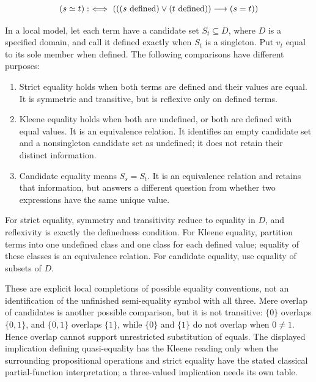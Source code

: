 \begin{definition}
\[
(s\simeq t) :\ \Longleftrightarrow\  (((s \mathrm{\ defined})\lor(t \mathrm{\ defined})) \longrightarrow (s=t))
\]
\end{definition}

\begin{proposition}
In a local model, let each term have a candidate set $S_t\subseteq D$,
where $D$ is a specified domain, and call it defined exactly when $S_t$
is a singleton. Put $v_t$ equal to its sole member when defined.
The following comparisons have different purposes:
\begin{enumerate}
\item Strict equality holds when both terms are defined and their values
are equal. It is symmetric and transitive, but is reflexive only on
defined terms.
\item Kleene equality holds when both are undefined, or both are defined
with equal values. It is an equivalence relation. It identifies an empty
candidate set and a nonsingleton candidate set as undefined; it does not
retain their distinct information.
\item Candidate equality means $S_s=S_t$. It is an equivalence relation
and retains that information, but answers a different question from
whether two expressions have the same unique value.
\end{enumerate}
\end{proposition}
\Proof
For strict equality, symmetry and transitivity reduce to equality in
$D$, and reflexivity is exactly the definedness condition. For Kleene
equality, partition terms into one undefined class and one class for each
defined value; equality of these classes is an equivalence relation.
For candidate equality, use equality of subsets of $D$.
\Done

These are explicit local completions of possible equality conventions,
not an identification of the unfinished semi-equality symbol with all
three. Mere overlap of candidates is another possible comparison, but
it is not transitive: $\{0\}$ overlaps $\{0,1\}$, and $\{0,1\}$
overlaps $\{1\}$, while $\{0\}$ and $\{1\}$ do not overlap when
$0\ne1$. Hence overlap cannot support unrestricted substitution of equals.
The displayed implication defining quasi-equality has the Kleene reading
only when the surrounding propositional operations and strict equality
have the stated classical partial-function interpretation; a three-valued
implication needs its own table.

